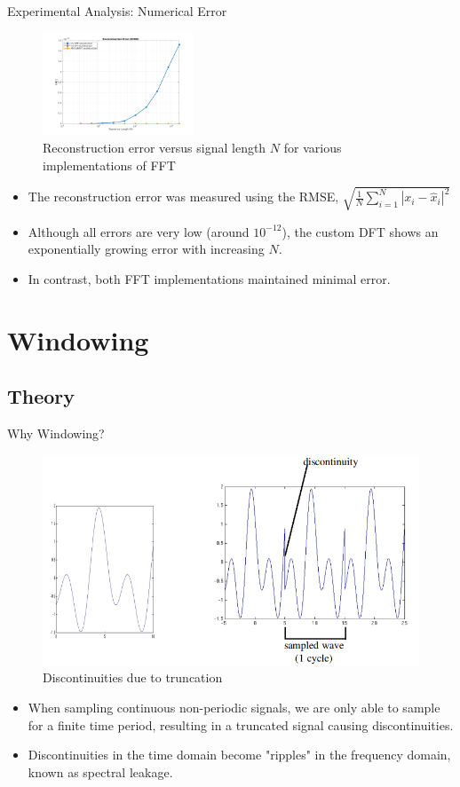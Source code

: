 \documentclass[10pt]{beamer}
\begin{document}
\begin{frame}{Experimental Analysis: Numerical Error}
    \begin{figure}[h]
        \centering
        \includegraphics[width=0.4\textwidth]{figures/recon.jpg}
        \caption{Reconstruction error versus signal length $N$ for various implementations of FFT}
        \label{fig:recon}
    \end{figure}
  \begin{itemize}
    \item The reconstruction error was measured using the RMSE, $\sqrt{\frac{1}{N}\sum_{i=1}^{N}|x_i - \hat{x}_i|^2}$
    \item Although all errors are very low (around \(10^{-12}\)), the custom DFT shows an exponentially growing error with increasing \(N\).
    \item In contrast, both FFT implementations maintained minimal error.
  \end{itemize}
\end{frame}



\section{Windowing}
\subsection{Theory}

\begin{frame}{Why Windowing?}
      \begin{figure}
        \centering
        \includegraphics[width=0.6\linewidth]{figures/discontinuous.png}
        \caption{Discontinuities due to truncation}
        \label{fig:1}
        \end{figure}
  \begin{itemize}
    \item  When sampling continuous non-periodic signals, we are only able to sample for a finite time period, resulting in a truncated signal causing discontinuities.
    \item Discontinuities in the time domain become "ripples" in the frequency domain, known as spectral leakage. 
    \end{itemize}
\end{frame}
\end{document}
